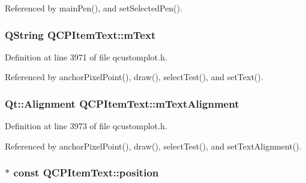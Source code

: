 Referenced by main\+Pen(), and set\+Selected\+Pen().

\hypertarget{class_q_c_p_item_text_a2dec3e08c11f51639629374ecec3bd62}{}
\subsubsection[{m\+Text}]{\setlength{\rightskip}{0pt plus 5cm}Q\+String Q\+C\+P\+Item\+Text\+::m\+Text\hspace{0.3cm}{\ttfamily [protected]}}\label{class_q_c_p_item_text_a2dec3e08c11f51639629374ecec3bd62}


Definition at line 3971 of file qcustomplot.\+h.



Referenced by anchor\+Pixel\+Point(), draw(), select\+Test(), and set\+Text().

\hypertarget{class_q_c_p_item_text_acdb2e50c38e83da00f083771efbd213f}{}
\subsubsection[{m\+Text\+Alignment}]{\setlength{\rightskip}{0pt plus 5cm}Qt\+::\+Alignment Q\+C\+P\+Item\+Text\+::m\+Text\+Alignment\hspace{0.3cm}{\ttfamily [protected]}}\label{class_q_c_p_item_text_acdb2e50c38e83da00f083771efbd213f}


Definition at line 3973 of file qcustomplot.\+h.



Referenced by anchor\+Pixel\+Point(), draw(), select\+Test(), and set\+Text\+Alignment().

\hypertarget{class_q_c_p_item_text_a0d228a00e819022b5690c65762721129}{}
\subsubsection[{position}]{$\ast$ const Q\+C\+P\+Item\+Text\+::position}\label{class_q_c_p_item_text_a0d228a00e819022b5690c65762721129}


